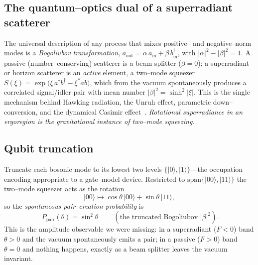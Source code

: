 \documentclass[11pt]{article}
\newcommand{\Ppair}{P_{\mathrm{pair}}}
\begin{document}
\subsection{The quantum--optics dual of a superradiant scatterer}
The universal description of any process that mixes positive-- and negative--norm modes is a
\emph{Bogoliubov transformation}, $a_{\mathrm{out}}=\alpha\,a_{\mathrm{in}}+\beta\,
b_{\mathrm{in}}^{\dagger}$, with $|\alpha|^2-|\beta|^2=1$. A passive (number--conserving)
scatterer is a beam splitter ($\beta=0$); a superradiant or horizon scatterer is an
\emph{active} element, a two--mode squeezer
$S(\xi)=\exp\!\big(\xi\,a^{\dagger}b^{\dagger}-\xi^{*}ab\big)$, which from the vacuum spontaneously
produces a correlated signal/idler pair with mean number $|\beta|^2=\sinh^2|\xi|$. This is the
single mechanism behind Hawking radiation, the Unruh effect, parametric down--conversion, and the
dynamical Casimir effect~\cite{brito2015,caves1982,nation2012}. \emph{Rotational superradiance
in an ergoregion is the gravitational instance of two--mode squeezing.}

\subsection{Qubit truncation}
Truncate each bosonic mode to its lowest two levels $\{\lvert0\rangle,\lvert1\rangle\}$---the
occupation encoding appropriate to a gate--model device. Restricted to
$\mathrm{span}\{\lvert00\rangle,\lvert11\rangle\}$ the two--mode squeezer acts as the rotation
\begin{equation}
\lvert00\rangle \longmapsto \cos\theta\,\lvert00\rangle + \sin\theta\,\lvert11\rangle ,
\end{equation}
so the \emph{spontaneous pair--creation probability} is
\begin{equation}
\boxed{\ \Ppair(\theta)=\sin^2\theta\ }\qquad(\text{the truncated Bogoliubov }|\beta|^2).
\end{equation}
This is the amplitude observable we were missing: in a superradiant ($F<0$) band $\theta>0$ and
the vacuum spontaneously emits a pair; in a passive ($F>0$) band $\theta=0$ and nothing happens,
exactly as a beam splitter leaves the vacuum invariant.
\end{document}
